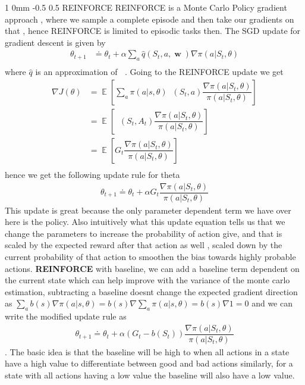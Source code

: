 \documentclass[twocolumn,11pt]{article}
\makeatletter
\DeclareMathOperator{\E}{\mathbb{E}}
\DeclareMathOperator{\w}{\textbf{w}}
\DeclareMathOperator{\qp}{q_\pi} %
\renewcommand{\subsection}{\@startsection
{subsection}%
{1}%
{0mm}%
{-0.5\baselineskip}%
{0.5\baselineskip}%
{\bfseries\color{blue}}} %
\makeatother
\begin{document}
\subsection{REINFORCE}
REINFORCE is a Monte Carlo Policy gradient approach ,  where we sample a complete episode and then take our gradients on that  , hence REINFORCE is limited to episodic  tasks then. 
The SGD update for gradient descent is given by 
\begin{align*}
\theta_{t+1} &\doteq \theta_t + \alpha \sum_a \hat{q}(S_t,  a, \w) \nabla \pi(a |S_t, \theta)\\
\end{align*} where $\hat{q}$ is an approximation of $\qp$. Going to the REINFORCE update we get 
\begin{align*}
\nabla J(\theta) &= \E\left[  \sum_a \pi(a|s,\theta) \qp(S_t, a)\dfrac{\nabla \pi(a|S_t,  \theta)}{\pi(a|S_t,  \theta)}\right]\\
&= \E\left[  \qp(S_t, A_t)\dfrac{\nabla \pi(a|S_t,  \theta)}{\pi(a|S_t,  \theta)}\right]\\
&= \E\left[  G_t\dfrac{\nabla \pi(a|S_t,  \theta)}{\pi(a|S_t,  \theta)}\right]\\
\end{align*} 
hence we get  the following update rule for theta 
\begin{align*}
\theta_{t+1}  \doteq \theta_t + \alpha G_t\dfrac{\nabla \pi(a|S_t,  \theta)}{\pi(a|S_t,  \theta)}
\end{align*}
This update is great because the only parameter dependent term we  have over here  is the policy. Also intuitively what this update equation tells us that we change the parameters to increase the probability of action give, and that is scaled by the  expected reward after that action as well , scaled down by the current probability of that action to smoothen the bias towards highly probable actions.
\textbf{REINFORCE} with baseline, we can add a baseline term  dependent on the current state which can  help improve with the variance of the monte carlo estimation, subtracting a baseline doesnt change the expected gradient direction as $\sum_a b(s) \nabla \pi(a|s, \theta) = b(s) \nabla \sum_a \pi(a | s, \theta) = b(s) \nabla 1 = 0$ and we can write the modified update rule as 
\begin{align*}
\theta_{t+1}  \doteq \theta_t + \alpha (G_t - b(S_t))\dfrac{\nabla \pi(a|S_t,  \theta)}{\pi(a|S_t,  \theta)}
\end{align*}. The  basic idea is that the baseline will be high to  when  all actions in a state have a high value to differentiate between good and bad actions similarly, for a state with all actions having a low value the baseline  will also have a low value.
\end{document}
